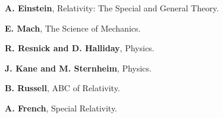 \documentclass[10pt,fleqn]{article}
\begin{document}
\vspace{+0.60em}

\par {}

\bigskip \smallskip

\par \noindent \textbf{A. Einstein}, Relativity: The Special and General Theory.
\bigskip
\par \noindent \textbf{E. Mach}, The Science of Mechanics.
\bigskip
\par \noindent \textbf{R. Resnick and D. Halliday}, Physics.
\bigskip
\par \noindent \textbf{J. Kane and M. Sternheim}, Physics.
\bigskip
\par \noindent \textbf{B. Russell}, ABC of Relativity.
\bigskip
\par \noindent \textbf{A. French}, Special Relativity.
\end{document}
